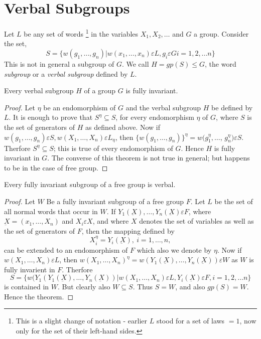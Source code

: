 \section{Verbal Subgroups}%
 
Let $L$ be any set of words \footnote{This is a slight change of
  notation - earlier $L$ stood for a set of laws $=1$, now only for
  the set of their left-hand sides.} in the variables $X_1, X_2,\ldots
$ and $G$ a group. Consider the set, 
 $$
 S= \Bigg \{w(g_1,\ldots,g_n) \bigg | w(x_1,\ldots,x_n)\varepsilon L, 
 g_i \varepsilon G i=1,2,\ldots n \Bigg\} 
 $$
 This is not in general a subgroup of $G$. We call $H=gp(S) \leq G$,
 the word \textit{subgroup} or a \textit{verbal subgroup} defined by
 $L$. 
 
\begin{Theorem}%
  Every verbal subgroup $H$ of a group $G$ is fully invariant.
\end{Theorem}
 
\begin{proof}
  Let $\eta$ be an endomorphism of $G$ and the verbal subgroup $H$ be
  defined by $L$. It is enough to prove that $S^\eta \subseteq S$, for
  every endomorphism $\eta $ of $G$, where $S$ is the set of
  generators of $H$ as defined above. Now if $w(g_1,\ldots 
 ,  g_n) \varepsilon S, w(X_1,\ldots,X_n)\varepsilon L_\eta
  $, then $\bigg\{w(g_1,\ldots,g_n)\bigg \}^\eta = w(g^\eta
  _1,\ldots$, $g^\eta_n) \varepsilon S$. Therfore $S^\eta \subseteq S$;
  this is true of every endomorphism of $G$. Hence $H$ is fully
  invariant in $G$. The converse of this theorem is not true in
  general; but happens to be in the case of free group. 
\end{proof}  
 
\begin{Theorem}%
  Every fully invariant subgroup of a free group is verbal.
\end{Theorem} 
 
\begin{proof}
  Let $W$ Be a fully invariant subgroup of a free group $F$. Let $L$
  be the set of all normal words that occur in $W$. If
  $Y_1(\underbar{X}),  \ldots,Y_n (\underbar{X}) \varepsilon F$, where
  $\underbar{X}=(x_1,\ldots,X_n)$ and $X_i \varepsilon X$, and where
  $X$ denotes the set of variables as well as the set of generators of
  $F$, then the mapping defined by 
  $$
  X^\eta_i = Y_i (\underbar{X}), ~ i = 1,\ldots,n,
  $$
  can be extended to an endomorphism of $F$ which also we denote by
  $\eta$. 
  Now if $w(X_1,\ldots,X_n) \varepsilon L$, then
  $w(X_1,\ldots,X_n)^\eta =
  w(Y_1(\underbar{X}),\ldots,Y_n(\underbar{X}))\varepsilon W$ as $W$
  is fully invarient in $F$. Therfore  
  $$
  S= \Bigg \{w(Y_1(Y_1(\underbar{X}),\ldots,Y_n (\underbar{X})) \bigg |
  w(X_1,\ldots,X_n)\varepsilon L,   
  Y_i (\underbar{X}) \varepsilon F,  i=1,2,\ldots n \Bigg\}
  $$
  is contained in $W$. But clearly also $W \subseteq S$. Thus $S=W$, and
  also $gp(S)=W$. Hence the theorem. 
\end{proof}

